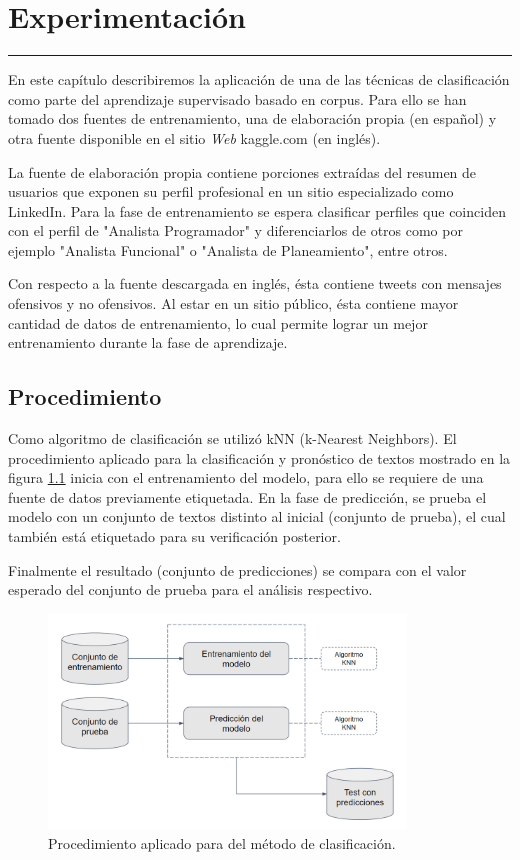 \chapter{Experimentación}
\hrule \bigskip \vspace*{1cm}

En este capítulo describiremos la aplicación de una de las técnicas de clasificación como parte del aprendizaje supervisado basado en corpus. Para ello se han tomado dos fuentes de entrenamiento, una de elaboración propia (en español) y otra fuente disponible en el sitio \emph{Web} kaggle.com (en inglés).

La fuente de elaboración propia contiene porciones extraídas del resumen de usuarios que exponen su perfil profesional en un sitio especializado como LinkedIn. Para la fase de entrenamiento se espera clasificar perfiles que coinciden con el perfil de "Analista Programador" y diferenciarlos de otros como por ejemplo "Analista Funcional" o "Analista de Planeamiento", entre otros.

Con respecto a la fuente descargada en inglés, ésta contiene tweets con mensajes ofensivos y no ofensivos. Al estar en un sitio público, ésta contiene mayor cantidad de datos de entrenamiento, lo cual permite lograr un mejor entrenamiento durante la fase de aprendizaje.

\section{Procedimiento}

Como algoritmo de clasificación se utilizó kNN (k-Nearest Neighbors). El procedimiento aplicado para la clasificación y pronóstico de textos mostrado en la figura \ref{fig:experimentacion} inicia con el entrenamiento del modelo, para ello se requiere de una fuente de datos previamente etiquetada. En la fase de predicción, se prueba el modelo con un conjunto de textos distinto al inicial (conjunto de prueba), el cual también está etiquetado para su verificación posterior.

Finalmente el resultado (conjunto de predicciones) se compara con el valor esperado del conjunto de prueba para el análisis respectivo.


\begin{figure}[h!]
	\begin{center}
	\includegraphics[angle=0,width=9.5cm]{Graficos/experimentacion1}
	\caption{Procedimiento aplicado para del método de clasificación.}
	\label{fig:experimentacion}
  \end{center}
\end{figure}

